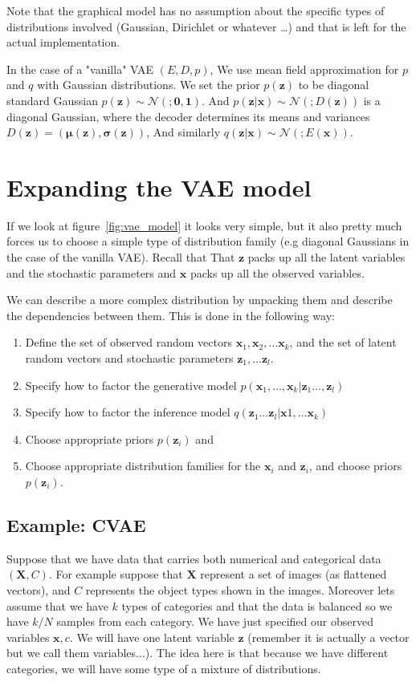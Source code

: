 \documentclass[11pt, a4paper]{report}
\theoremstyle{plain}
\theoremstyle{definition}
\newtheorem{mydef}{Definition}[chapter]
\theoremstyle{remark}
\newcommand{\X}{\mathbf{X}}
\newcommand{\x}{\mathbf{x}}
\newcommand{\z}{\mathbf{z}}
\newcommand{\NN}{\mathcal{N}}
\newcommand{\bv}[1]{\boldsymbol{#1}}
\begin{document}
Note that the graphical model has no assumption about the specific types of
distributions involved (Gaussian, Dirichlet or whatever \dots) and that is left
for the actual implementation.

In the case of a "vanilla" VAE $(E,D,p)$, 
We use mean field approximation for $p$ and $q$ with Gaussian distributions.
We set the prior $p(\z)$ to be diagonal standard Gaussian
$p(\z) \sim \NN(;\bv{0},\bv{1})$.
And $p(\z | \x) \sim \NN(;D(\z))$ is a diagonal Gaussian, where the decoder
determines its means and variances $D(\z) = (\bv{\mu}(\z), \bv{\sigma}(\z))$, 
And similarly $q(\z | \x) \sim \NN(;E(\x))$.



\section{Expanding the VAE model}
If we look at figure~\ref{fig:vae_model} it looks very simple, but it also
pretty much forces us to choose a simple type of distribution family (e.g
diagonal Gaussians in the case of the vanilla VAE).
Recall that That $\z$ packs up all the latent variables and the stochastic
parameters and $\x$ packs up all the observed variables.

We can describe a more complex distribution by unpacking them and describe the
dependencies between them.
This is done in the following way:
\label{VAE-specs}
\begin{enumerate}
\item{} Define the set of observed random vectors $\x_1, \x_2, \dots \x_k$, and 
the set of latent random vectors and stochastic parameters $\z_1, \dots \z_l$.
\item{} Specify how to factor the generative model $p(\x_1,\dots, \x_k| \z_1
\dots , \z_l)$
\item{} Specify how to factor the inference model $q(\z_1 \dots \z_l | \x1,
\dots \x_k)$
\item{} Choose appropriate priors $p(\z_i)$ and
\item{} Choose appropriate distribution families for the $\x_i$ and $\z_i$,
and choose priors $p(\z_i)$.
\end{enumerate}

\subsection{Example: CVAE}
Suppose that we have data that carries both numerical and categorical data $(\X,
C)$.
For example suppose that $\X$ represent a set of images (as flattened vectors),
and $C$ represents the object types shown in the images.
Moreover lets assume that we have $k$ types of categories and that the data is
balanced so we have $k/N$ samples from each category.
We have just specified our observed variables $\x, c$.
We will have one latent variable $\z$ (remember it is actually a vector but we
call them variables...).
The idea here is that because we have different categories, we will have some
type of a mixture of distributions.
\end{document}
